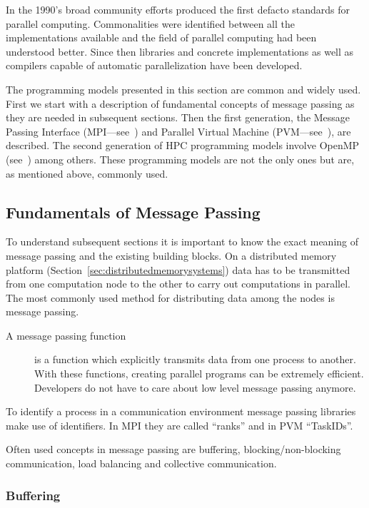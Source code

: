 In the 1990's broad community efforts produced the first defacto
standards for parallel computing. Commonalities were identified
between all the implementations available and the field of parallel
computing had been understood better. Since then libraries and concrete
implementations as well as compilers capable of automatic
parallelization have been developed.


The programming models presented in this section are common and widely
used. First we start with a description of fundamental concepts of
message passing as they are needed in subsequent sections. Then the
first generation, the Message Passing Interface 
(MPI---see~\cite{forum94:MPI}) and Parallel Virtual Machine
(PVM---see~\cite{geist94pvm}),
are described. The second generation of HPC programming
models involve OpenMP (see~\cite{openMP05}) among others. These
programming models are not the only ones 
but are, as mentioned above, commonly used. 

\subsection{Fundamentals of Message Passing}
\label{sec:messagepassing}

To understand subsequent sections it is important to know the exact
meaning of message passing and the existing building blocks.
On a distributed memory platform
(Section~\ref{sec:distributedmemorysystems}) data has to be transmitted
from one computation node to the other to carry out computations in
parallel. The most commonly used method for distributing data among
the nodes is message passing.
  
\begin{description}
\item[A message passing function] is a function which explicitly transmits
  data from one process to another. With these
  functions, creating parallel programs can be extremely
  efficient. Developers do not have to care about low level
  message passing anymore.
\end{description}

To identify a process in a communication environment message passing
libraries make use of identifiers. In MPI they are called ``ranks''
and in PVM ``TaskIDs''.

Often used concepts in message passing are buffering,
blocking/non-blocking communication, load balancing and collective
communication. 

\subsubsection{Buffering}

